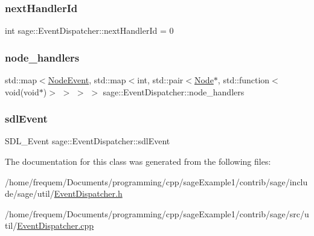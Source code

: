 \mbox{\label{classsage_1_1EventDispatcher_a45a41623356399b6a9afa584762e1897}} 
\subsubsection{\texorpdfstring{nextHandlerId}{nextHandlerId}}
{\footnotesize\ttfamily int sage\+::\+Event\+Dispatcher\+::next\+Handler\+Id = 0\hspace{0.3cm}{\ttfamily [private]}}

\mbox{\label{classsage_1_1EventDispatcher_abd1d2825777e4be4daa9250e1cc04072}} 
\subsubsection{\texorpdfstring{node\_handlers}{node\_handlers}}
{\footnotesize\ttfamily std\+::map$<$\mbox{\hyperlink{namespacesage_ad2c7b0e1ebf67f572d43620e6b07aa13}{Node\+Event}}, std\+::map$<$int, std\+::pair$<$\mbox{\hyperlink{classsage_1_1Node}{Node}}$\ast$, std\+::function$<$void(void$\ast$)$>$ $>$ $>$ $>$ sage\+::\+Event\+Dispatcher\+::node\+\_\+handlers\hspace{0.3cm}{\ttfamily [private]}}

\mbox{\label{classsage_1_1EventDispatcher_acc93b97b0ed92a64ab2e2040dc8ca04c}} 
\subsubsection{\texorpdfstring{sdlEvent}{sdlEvent}}
{\footnotesize\ttfamily S\+D\+L\+\_\+\+Event sage\+::\+Event\+Dispatcher\+::sdl\+Event\hspace{0.3cm}{\ttfamily [private]}}



The documentation for this class was generated from the following files\+:\begin{DoxyCompactItemize}
\item 
/home/frequem/\+Documents/programming/cpp/sage\+Example1/contrib/sage/include/sage/util/\mbox{\hyperlink{EventDispatcher_8h}{Event\+Dispatcher.\+h}}\item 
/home/frequem/\+Documents/programming/cpp/sage\+Example1/contrib/sage/src/util/\mbox{\hyperlink{EventDispatcher_8cpp}{Event\+Dispatcher.\+cpp}}\end{DoxyCompactItemize}
